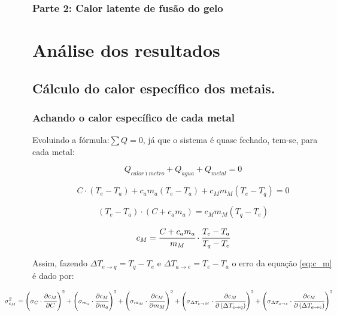 \documentclass[a4paper]{article}
\begin{document}
		\subsubsection{Parte 2: Calor latente de fusão do gelo}


	\section{Análise dos resultados}


		\subsection{Cálculo do calor específico dos metais.}

			\subsubsection{Achando o calor específico de cada metal}

				Evoluindo a fórmula:$\sum Q=0$, já que o sistema é quase fechado,
				tem-se, para cada metal:

				\begin{equation}
				Q_{calor\acute{\imath}metro}+Q_{\acute{a}gua}+Q_{metal}=0
				\end{equation}


				\[
				C\cdot\left(T_{e}-T_{a}\right)+c_{a}m_{a}\left(T_{e}-T_{a}\right)+c_{M}m_{M}\left(T_{e}-T_{q}\right)=0
				\]


				\[
				\left(T_{e}-T_{a}\right)\cdot\left(C+c_{a}m_{a}\right)=c_{M}m_{M}\left(T_{q}-T_{e}\right)
				\]


				\begin{equation}
				c_{M}=\cfrac{C+c_{a}m_{a}}{m_{M}}\cdot\cfrac{T_{e}-T_{a}}{T_{q}-T_{e}}\label{eq:c_m}
				\end{equation}


				Assim, fazendo $\Delta T_{e\rightarrow q}=T_{q}-T_{e}$ e $\Delta T_{a\rightarrow e}=T_{e}-T_{a}$
				o erro da equação \eqref{eq:c_m} é dado por:
                
                \begin{equation}
                \hspace{-1,5cm}%
				\sigma_{c_{M}}^{2}=\left(\sigma_{C}\cdot\cfrac{\partial c_{M}}{\partial C}\right)^{2}+\left(\sigma_{m_{a}}\cdot\cfrac{\partial c_{M}}{\partial m_{a}}\right)^{2}+\left(\sigma_{m_{M}}\cdot\cfrac{\partial c_{M}}{\partial m_{M}}\right)^{2}+\left(\sigma_{\Delta T_{e\rightarrow M}}\cdot\cfrac{\partial c_{M}}{\partial\left(\Delta T_{e\rightarrow q}\right)}\right)^{2}+\left(\sigma_{\Delta T_{a\rightarrow e}}\cdot\cfrac{\partial c_{M}}{\partial\left(\Delta T_{a\rightarrow e}\right)}\right)^{2}
				\end{equation}
\end{document}
